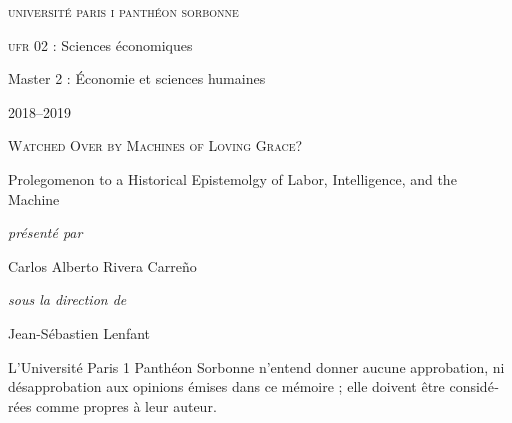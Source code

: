 \begin{titlepage}
 \centering
\begin{french}
 {\large \textsc{université paris i panthéon sorbonne} \par}
  \vspace*{0.01\textheight}
 {\large \textsc{ufr} 02 : Sciences économiques  \par}
  \vspace*{0.01\textheight}
 {\large Master 2 : Économie et sciences humaines \par}
  \vspace*{0.01\textheight}
 {\large 2018--2019 \par}
\end{french}
  \vspace*{0.3\textheight}
 {\huge \textsc{Watched Over by Machines of Loving Grace?}  \par}
  \vspace*{0.02\textheight}
 {\Large Prolegomenon to a Historical Epistemolgy of  Labor, Intelligence, and the Machine \par}
\vfill
\begin{french}
 {\large\itshape présenté par  \par}
\end{french}
 {\Large Carlos Alberto Rivera Carreño \par}
  \vspace*{0.05\textheight}
\begin{french}
 {\large\itshape sous la direction de \par}
\end{french}
 {\Large Jean-Sébastien Lenfant \par}
\end{titlepage}

\pagestyle{empty}

\begin{french}
L'Université Paris 1 Panthéon Sorbonne n'entend donner aucune approbation,
ni désapprobation aux opinions émises dans ce mémoire ; elle doivent être
considérées comme propres à leur auteur. 
\end{french}
\vfill

